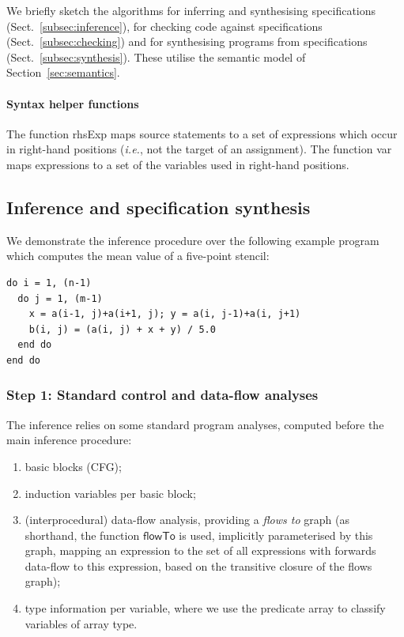 \documentclass[9pt]{sigplanconf}
\newcounter{block}
\theoremstyle{definition}
\newcommand{\ie}{\emph{i.e.}}
\newcommand{\arrayTy}{\textsf{array}}
\newcommand{\rhsExp}{\textsf{rhsExp}}
\newcommand{\var}{\textsf{var}}
\begin{document}
\noindent
We briefly sketch the algorithms for inferring and synthesising
specifications (Sect.~\ref{subsec:inference}), for checking code
against specifications (Sect.~\ref{subsec:checking}) and for
synthesising programs from specifications
(Sect.~\ref{subsec:synthesis}).  These utilise the semantic model of
Section~\ref{sec:semantics}.

\paragraph{Syntax helper functions}
The function \rhsExp{} maps source statements to a
set of expressions which occur in right-hand positions (\ie{}, not the
target of an assignment). The function \var{} maps expressions to a
set of the variables used in right-hand positions.

\subsection{Inference and specification synthesis\label{subsec:inference}}

We demonstrate the inference procedure over the
following example program which computes the mean value
of a five-point stencil:%
\begin{verbatim}
do i = 1, (n-1)
  do j = 1, (m-1)
    x = a(i-1, j)+a(i+1, j); y = a(i, j-1)+a(i, j+1)
    b(i, j) = (a(i, j) + x + y) / 5.0
  end do
end do
\end{verbatim}
\subsubsection{Step 1: Standard control and data-flow analyses}
\label{sec:inf-step1}

The inference relies on some standard program analyses, computed
before the main inference procedure:
%
\begin{enumerate}
\item basic blocks (CFG);
\item induction variables per basic block;
\item (interprocedural) data-flow analysis, providing a \emph{flows to}
  graph (as shorthand, the function
  $\mathsf{flowTo}$ is used, implicitly parameterised by this graph,
  mapping an expression to the set of all expressions
  with forwards data-flow to this expression, based on the transitive
  closure of the flows graph);
\item type information per variable, where we use the predicate
\arrayTy{} to classify variables of array type.
\end{enumerate}
%
\end{document}
